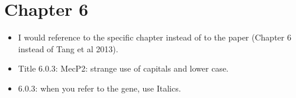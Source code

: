 \documentclass[12pt,a4paper,sans]{article}
\begin{document}
\section{Chapter 6}

\begin{itemize}
   \item{I would reference to the specific chapter instead of to the paper (Chapter 6 instead of Tang et al 2013).}
\end{itemize}

\begin{itemize}
   \item{Title 6.0.3: MecP2: strange use of capitals and lower case.}
\end{itemize}

\begin{itemize}
   \item{6.0.3: when you refer to the gene, use Italics.}
\end{itemize}
\end{document}
